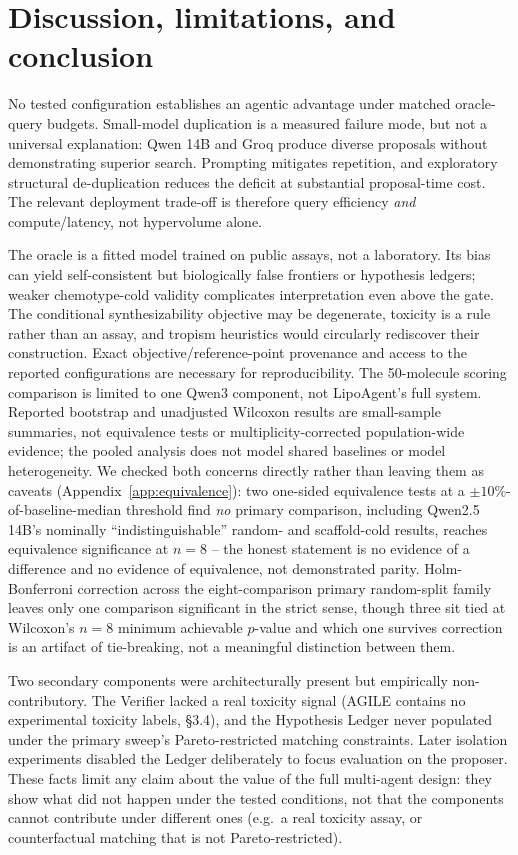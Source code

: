 \documentclass{article}
\begin{document}
\section{Discussion, limitations, and conclusion}
\label{sec:discussion}
No tested configuration establishes an agentic advantage under matched oracle-query budgets. Small-model duplication is a measured failure mode, but not a universal explanation: Qwen 14B and Groq produce diverse proposals without demonstrating superior search. Prompting mitigates repetition, and exploratory structural de-duplication reduces the deficit at substantial proposal-time cost. The relevant deployment trade-off is therefore query efficiency \emph{and} compute/latency, not hypervolume alone.

The oracle is a fitted model trained on public assays, not a laboratory. Its bias can yield self-consistent but biologically false frontiers or hypothesis ledgers; weaker chemotype-cold validity complicates interpretation even above the gate. The conditional synthesizability objective may be degenerate, toxicity is a rule rather than an assay, and tropism heuristics would circularly rediscover their construction. Exact objective/reference-point provenance and access to the reported configurations are necessary for reproducibility. The 50-molecule scoring comparison is limited to one Qwen3 component, not LipoAgent's full system. Reported bootstrap and unadjusted Wilcoxon results are small-sample summaries, not equivalence tests or multiplicity-corrected population-wide evidence; the pooled analysis does not model shared baselines or model heterogeneity. We checked both concerns directly rather than leaving them as caveats (Appendix~\ref{app:equivalence}): two one-sided equivalence tests at a $\pm10\%$-of-baseline-median threshold find \emph{no} primary comparison, including Qwen2.5 14B's nominally ``indistinguishable'' random- and scaffold-cold results, reaches equivalence significance at $n=8$ -- the honest statement is no evidence of a difference and no evidence of equivalence, not demonstrated parity. Holm-Bonferroni correction across the eight-comparison primary random-split family leaves only one comparison significant in the strict sense, though three sit tied at Wilcoxon's $n=8$ minimum achievable $p$-value and which one survives correction is an artifact of tie-breaking, not a meaningful distinction between them.

Two secondary components were architecturally present but empirically non-contributory. The Verifier lacked a real toxicity signal (AGILE contains no experimental toxicity labels, \S3.4), and the Hypothesis Ledger never populated under the primary sweep's Pareto-restricted matching constraints. Later isolation experiments disabled the Ledger deliberately to focus evaluation on the proposer. These facts limit any claim about the value of the full multi-agent design: they show what did not happen under the tested conditions, not that the components cannot contribute under different ones (e.g.\ a real toxicity assay, or counterfactual matching that is not Pareto-restricted).
\end{document}
